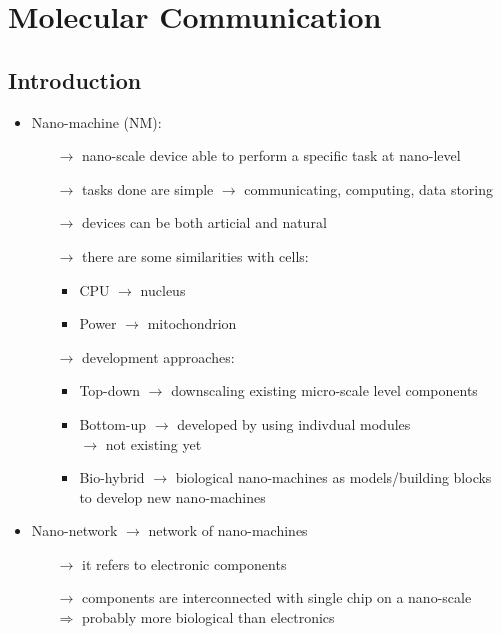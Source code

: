 \section{Molecular Communication}
\subsection{Introduction}
\begin{itemize}
    \item Nano-machine (NM):
    \begin{itemize}
        \item[$\rightarrow$] nano-scale device able to perform a specific task at nano-level
        \item[$\rightarrow$] tasks done are simple $\rightarrow$ communicating, computing, data storing
        \item[$\rightarrow$] devices can be both articial and natural
        \item[$\rightarrow$] there are some similarities with cells:
        \begin{itemize}
            \item CPU $\rightarrow$ nucleus
            \item Power $\rightarrow$ mitochondrion
        \end{itemize}
        \item[$\rightarrow$] development approaches:
        \begin{itemize}
            \item Top-down $\rightarrow$ downscaling existing micro-scale level components
            \item Bottom-up $\rightarrow$ developed by using indivdual modules\\
            \hspace*{1.7cm}$\rightarrow$ not existing yet
            \item Bio-hybrid $\rightarrow$ biological nano-machines as models/building blocks\\
            \hspace*{2.1cm}to develop new nano-machines
        \end{itemize}
    \end{itemize}
    \item Nano-network $\rightarrow$ network of nano-machines
    \begin{itemize}
        \item[$\rightarrow$] it refers to electronic components
        \item[$\rightarrow$] components are interconnected with single chip on a nano-scale\\
        $\Rightarrow$ probably more biological than electronics
    \end{itemize} 
\end{itemize}
